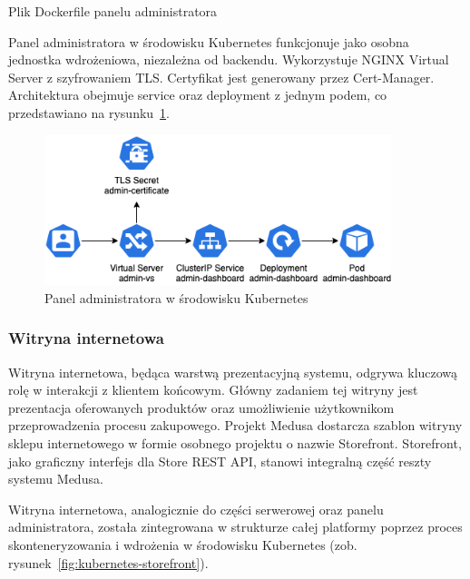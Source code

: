 \begin{listing}[H]
    \inputminted[xleftmargin=20pt,linenos]{docker}{code/Dockerfile.admin}
    \caption{Plik Dockerfile panelu administratora}
    \label{lst:medusajs-admin-dockerfile}
\end{listing}

Panel administratora w środowisku Kubernetes funkcjonuje jako osobna jednostka wdrożeniowa, niezależna od backendu.
Wykorzystuje NGINX Virtual Server z szyfrowaniem TLS. Certyfikat jest generowany przez Cert-Manager.
Architektura obejmuje service oraz deployment z jednym podem, co przedstawiano na rysunku~\ref{fig:kubernetes-admin}.

\begin{figure}[H]
    \centering
    \includegraphics[width=0.9\textwidth]{img/kubernetes-admin-panel}
    \caption{Panel administratora w środowisku Kubernetes}
    \label{fig:kubernetes-admin}
\end{figure}

\subsubsection{Witryna internetowa}

Witryna internetowa, będąca warstwą prezentacyjną systemu, odgrywa kluczową rolę w interakcji z klientem końcowym.
Główny zadaniem tej witryny jest prezentacja oferowanych produktów oraz umożliwienie użytkownikom przeprowadzenia procesu zakupowego.
Projekt Medusa dostarcza szablon witryny sklepu internetowego w formie osobnego projektu o nazwie Storefront.
Storefront, jako graficzny interfejs dla Store REST API, stanowi integralną część reszty systemu Medusa.

Witryna internetowa, analogicznie do części serwerowej oraz panelu administratora, została zintegrowana w strukturze całej platformy poprzez proces skonteneryzowania i wdrożenia w środowisku Kubernetes (zob. rysunek~\ref{fig:kubernetes-storefront}).

